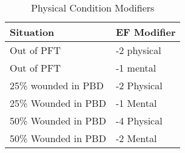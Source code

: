 \begin{table}[hb]
\caption{Physical Condition Modifiers}
\centering
	\begin{tabular}{||l|l||} \hline
	Situation			& EF Modifier	\\ \hline
	Out of PFT			& -2 physical	\\
	Out of PFT			& -1 mental		\\
	25\% wounded in PBD & -2 Physical	\\
	25\% Wounded in PBD & -1 Mental		\\
	50\% Wounded in PBD & -4 Physical	\\
	50\% Wounded in PBD & -2 Mental		\\ \hline
	\end{tabular}
\end{table}
